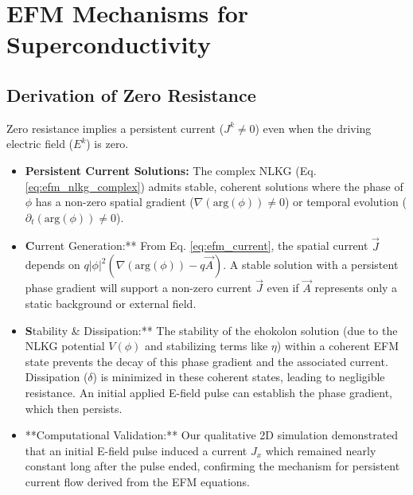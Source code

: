 \documentclass[11pt]{article}
\begin{document}
\section{EFM Mechanisms for Superconductivity}

\subsection{Derivation of Zero Resistance}
Zero resistance implies a persistent current (\(J^k \neq 0\)) even when the driving electric field (\(E^k\)) is zero.
\begin{itemize}
    \item \textbf{Persistent Current Solutions:} The complex NLKG (Eq. \ref{eq:efm_nlkg_complex}) admits stable, coherent solutions where the phase of \(\phi\) has a non-zero spatial gradient (\(\nabla (\text{arg}(\phi)) \neq 0\)) or temporal evolution (\(\partial_t (\text{arg}(\phi)) \neq 0\)).
    \item \textbf Current Generation:** From Eq. \ref{eq:efm_current}, the spatial current \(\vec{J}\) depends on \(q|\phi|^2(\nabla(\text{arg}(\phi)) - q\vec{A})\). A stable solution with a persistent phase gradient will support a non-zero current \(\vec{J}\) even if \(\vec{A}\) represents only a static background or external field.
    \item \textbf Stability \& Dissipation:** The stability of the ehokolon solution (due to the NLKG potential \(V(\phi)\) and stabilizing terms like \(\eta\)) within a coherent EFM state prevents the decay of this phase gradient and the associated current. Dissipation (\(\delta\)) is minimized in these coherent states, leading to negligible resistance. An initial applied E-field pulse can establish the phase gradient, which then persists.
    \item **Computational Validation:** Our qualitative 2D simulation demonstrated that an initial E-field pulse induced a current \(J_x\) which remained nearly constant long after the pulse ended, confirming the mechanism for persistent current flow derived from the EFM equations.
\end{itemize}
\end{document}
